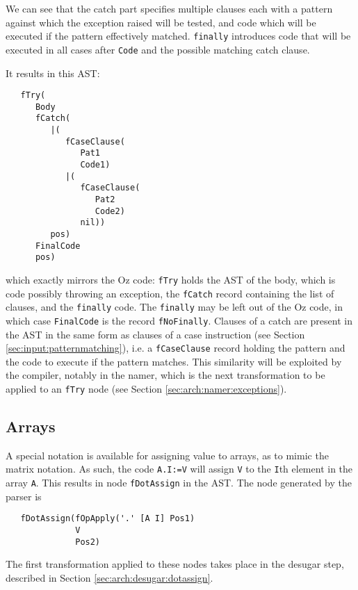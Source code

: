 \documentclass[a4paper]{memoir}
\begin{document}
We can see that the catch part specifies multiple clauses each with a pattern
against which the exception raised will be tested, and code which will be
executed if the pattern effectively matched. \lstinline!finally! introduces code
that will be executed in all cases after \lstinline!Code! and the possible
matching catch clause.

It results in this AST:
\begin{lstlisting}
   fTry(
      Body
      fCatch(
         |(
            fCaseClause(
               Pat1
               Code1)
            |(
               fCaseClause(
                  Pat2
                  Code2)
               nil))
         pos)
      FinalCode
      pos)
\end{lstlisting}

which exactly mirrors the Oz code: \lstinline!fTry! holds the AST of the body,
which is code possibly throwing an exception, the \lstinline!fCatch! record containing the list of
clauses, and the \lstinline!finally! code. The \lstinline!finally! may be left
out of the Oz code, in which case \lstinline!FinalCode! is the record
\lstinline!fNoFinally!.
Clauses of a catch are present in the AST in the same form as clauses of a case
instruction (see Section \ref{sec:input:patternmatching}), i.e. a
\lstinline!fCaseClause! record holding the pattern and the code to execute if
the pattern matches. This similarity will be exploited by the compiler, notably
in the namer, which is the next transformation to be applied to an
\lstinline!fTry! node (see Section \ref{sec:arch:namer:exceptions}).
\subsection{Arrays}
A special notation is available for assigning value to arrays, as to mimic the
matrix notation. As such, the code \lstinline!A.I:=V! will assign \lstinline!V!
to the \lstinline!I!th element in the array \lstinline!A!.
This results in node \lstinline!fDotAssign! in the AST. The node generated by
the parser is
\begin{lstlisting}
   fDotAssign(fOpApply('.' [A I] Pos1) 
              V 
              Pos2) 
\end{lstlisting}
The first transformation applied to these nodes takes place in the desugar step,
described in Section \ref{sec:arch:desugar:dotassign}.
\end{document}
